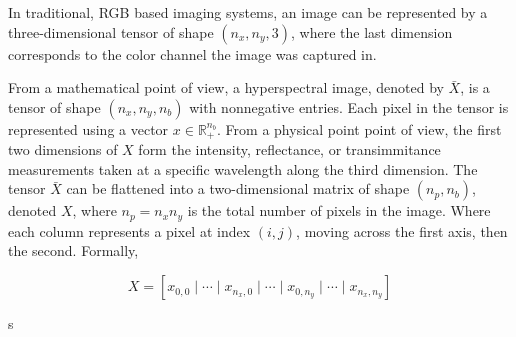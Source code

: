 In traditional, RGB based imaging systems, an image can be represented by a three-dimensional tensor of shape $(n_x, n_y, 3)$, where the last dimension corresponds to the color channel the image was captured in.

From a mathematical point of view, a hyperspectral image, denoted by $\bar{X}$, is a tensor of shape $(n_x, n_y, n_b)$ with nonnegative entries. Each pixel in the tensor is represented using a vector $x \in \mathbb{R}_+^{n_b}$. From a physical point point of view, the first two dimensions of $X$ form the intensity, reflectance, or transimmitance measurements taken at a specific wavelength along the third dimension. The tensor $\bar{X}$ can be flattened into a two-dimensional matrix of shape $(n_p, n_b)$, denoted $X$, where $n_p = n_x n_y$ is the total number of pixels in the image. Where each column represents a pixel at index $(i,j)$, moving across the first axis, then the second. Formally,

$$
X = \left[ x_{0,0} \mid \cdots \mid x_{n_x,0} \mid \cdots \mid x_{0,n_y} \mid \cdots \mid x_{n_x, n_y} \right]
$$

s